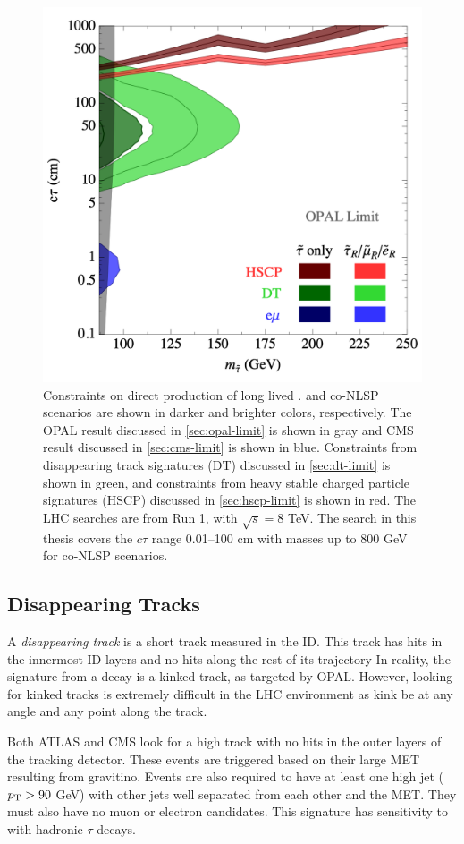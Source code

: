 \begin{figure}[!h]
\centering
\includegraphics[width=.6\textwidth]{figures/theory/slep-limits.png}
\caption{Constraints on direct production of long lived \slep. \stau and co-NLSP scenarios are shown in darker and brighter colors, respectively. The OPAL result discussed in \autoref{sec:opal-limit} is shown in gray and \ac{CMS} result discussed in \autoref{sec:cms-limit} is shown in blue. Constraints from disappearing track signatures (DT) discussed in \autoref{sec:dt-limit} is shown in green, and constraints from heavy stable charged particle signatures (HSCP) discussed in \autoref{sec:hscp-limit} is shown in red. The \ac{LHC} searches are from Run 1, with $\sqrt{s} = 8$ TeV. The search in this thesis covers the $c \tau$ range 0.01--100 cm with masses up to 800 GeV for co-NLSP scenarios. \cite{jesseshelton}}
\label{fig:jesse}
\end{figure}


\subsection{Disappearing Tracks}
\label{sec:dt-limit}

A \emph{disappearing track} is a short track measured in the \acf{ID}. This track has hits in the innermost \ac{ID} layers and no hits along the rest of its trajectory In reality, the signature from a \slep decay is a kinked track, as targeted by OPAL. However, looking for kinked tracks is extremely difficult in the \ac{LHC} environment as kink be at any angle and any point along the track.

Both \ac{ATLAS} and \ac{CMS} look for a high \pt track with no hits in the outer layers of the tracking detector. These events are triggered based on their large \ac{MET} resulting from gravitino. Events are also required to have at least one high \pt jet ($p_{\text{T}} > 90$ GeV) with other jets well separated from each other and the \ac{MET}. They must also have no muon or electron candidates. This signature has sensitivity to \stau with hadronic $\tau$ decays.


